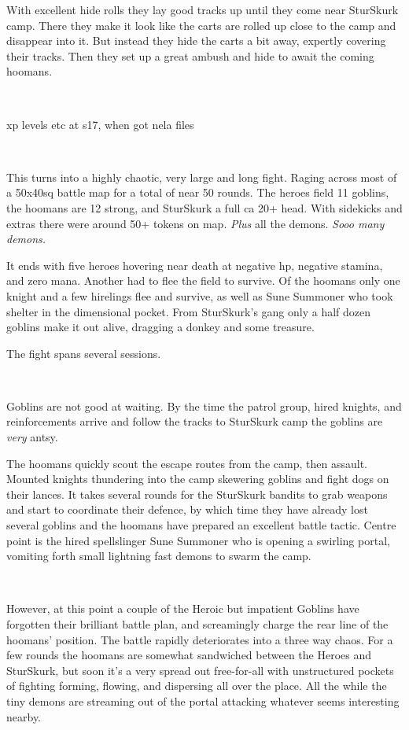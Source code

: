 With excellent hide rolls they lay good tracks up until they come near SturSkurk camp. There they make it look like the carts are rolled up close to the camp and disappear into it. But instead they hide the carts a bit away, expertly covering their tracks. Then they set up a great ambush and hide to await the coming hoomans.

\

\todo xp levels etc at s17, when got nela files

\

This turns into a highly chaotic, very large and long fight. Raging across most of a 50x40sq battle map for a total of near 50 rounds. The heroes field 11 goblins, the hoomans are 12 strong, and SturSkurk a full ca 20+ head. With sidekicks and extras there were around 50+ tokens on map. \emph{Plus} all the demons. \emph{Sooo many demons.}

It ends with five heroes hovering near death at negative hp, negative stamina, and zero mana. Another had to flee the field to survive. Of the hoomans only one knight and a few hirelings flee and survive, as well as Sune Summoner who took shelter in the dimensional pocket. From SturSkurk's gang only a half dozen goblins make it out alive, dragging a donkey and some treasure.

The fight spans several sessions.

\

Goblins are not good at waiting. By the time the patrol group, hired knights, and reinforcements arrive and follow the tracks to SturSkurk camp the goblins are \emph{very} antsy.

The hoomans quickly scout the escape routes from the camp, then assault. Mounted knights thundering into the camp skewering goblins and fight dogs on their lances. It takes several rounds for the SturSkurk bandits to grab weapons and start to coordinate their defence, by which time they have already lost several goblins and the hoomans have prepared an excellent battle tactic. Centre point is the hired spellslinger Sune Summoner who is opening a swirling portal, vomiting forth small lightning fast demons to swarm the camp.

\

However, at this point a couple of the Heroic but impatient Goblins have forgotten their brilliant battle plan, and screamingly charge the rear line of the hoomans' position. The battle rapidly deteriorates into a three way chaos. For a few rounds the hoomans are somewhat sandwiched between the Heroes and SturSkurk, but soon it's a very spread out free-for-all with unstructured pockets of fighting forming, flowing, and dispersing all over the place. All the while the tiny demons are streaming out of the portal attacking whatever seems interesting nearby. 


